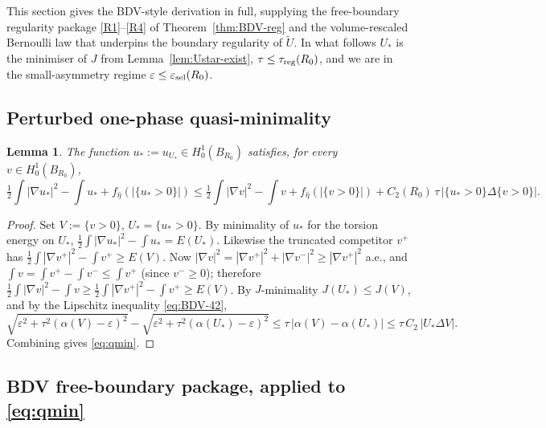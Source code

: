 \documentclass[11pt]{amsart}
\newtheorem{lemma}[theorem]{Lemma}
\newcommand{\eps}{\varepsilon}
\newcommand{\wt}{\widetilde}
\begin{document}
This section gives the BDV-style derivation in full, supplying the
free-boundary regularity package \ref{R1}--\ref{R4} of
Theorem~\ref{thm:BDV-reg} and the volume-rescaled Bernoulli law that
underpins the boundary regularity of \(\wt U\).  In what follows
\(U_*\) is the minimiser of \(J\) from Lemma~\ref{lem:Ustar-exist},
\(\tau\le\tau_{\rm reg}(R_0)\), and we are in the small-asymmetry
regime \(\eps\le\eps_{\rm sel}(R_0)\).

\subsection{Perturbed one-phase quasi-minimality}\label{ss:qmin}

\begin{lemma}\label{lem:qmin}
The function \(u_*:=u_{U_*}\in H^{1}_{0}(B_{R_0})\) satisfies, for
every \(v\in H^{1}_{0}(B_{R_0})\),
\begin{equation}\label{eq:qmin}
   \tfrac12\!\int|\nabla u_*|^{2}-\!\int u_{*}
   +f_{\hat\eta}(|\{u_*>0\}|)
   \le
   \tfrac12\!\int|\nabla v|^{2}-\!\int v
   +f_{\hat\eta}(|\{v>0\}|)
   +C_2(R_0)\,\tau\,\bigl|\{u_*>0\}\Delta\{v>0\}\bigr|.
\end{equation}
\end{lemma}

\begin{proof}
Set \(V:=\{v>0\}\), \(U_*=\{u_*>0\}\).  By minimality of \(u_*\) for the
torsion energy on \(U_*\), \(\tfrac12\!\int|\nabla u_*|^{2}-\!\int
u_*=E(U_*)\).  Likewise the truncated competitor \(v^{+}\) has
\(\tfrac12\!\int|\nabla v^{+}|^{2}-\!\int v^{+}\ge E(V)\).  Now
\(|\nabla v|^{2}=|\nabla v^{+}|^{2}+|\nabla v^{-}|^{2}\ge|\nabla
v^{+}|^{2}\) a.e., and \(\int v=\int v^{+}-\int v^{-}\le\int v^{+}\)
(since \(v^{-}\ge 0\)); therefore
\(\tfrac12\!\int|\nabla v|^{2}-\!\int v\ge\tfrac12\!\int|\nabla
v^{+}|^{2}-\!\int v^{+}\ge E(V)\).  By \(J\)-minimality
\(J(U_*)\le J(V)\), and by the Lipschitz inequality \eqref{eq:BDV-42},
\[
   \sqrt{\eps^{2}+\tau^{2}(\alpha(V)-\eps)^{2}}
   -\sqrt{\eps^{2}+\tau^{2}(\alpha(U_*)-\eps)^{2}}
   \le\tau\,|\alpha(V)-\alpha(U_*)|
   \le\tau\,C_{2}\,|U_*\Delta V|.
\]
Combining gives \eqref{eq:qmin}.
\end{proof}

\subsection{BDV free-boundary package, applied to \eqref{eq:qmin}}
\label{ss:BDV-pkg}
\end{document}
